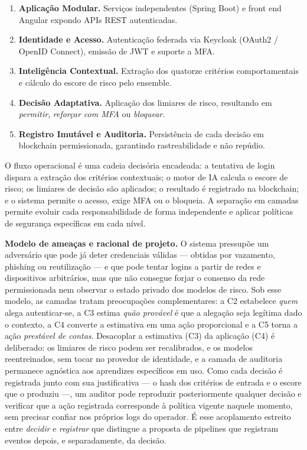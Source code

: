 \documentclass[conference]{IEEEtran}
\begin{document}
\begin{enumerate}
  \item \textbf{Aplicação Modular.} Serviços independentes (Spring Boot)
        e front end Angular expondo APIs REST autenticadas.
  \item \textbf{Identidade e Acesso.} Autenticação federada via Keycloak
        (OAuth2 / OpenID Connect), emissão de JWT e suporte a MFA.
  \item \textbf{Inteligência Contextual.} Extração dos quatorze critérios
        comportamentais e cálculo do escore de risco pelo ensemble.
  \item \textbf{Decisão Adaptativa.} Aplicação dos limiares de risco,
        resultando em \emph{permitir}, \emph{reforçar com MFA} ou
        \emph{bloquear}.
  \item \textbf{Registro Imutável e Auditoria.} Persistência de cada
        decisão em blockchain permissionada, garantindo rastreabilidade
        e não repúdio.
\end{enumerate}

O fluxo operacional é uma cadeia decisória encadeada: a tentativa de
login dispara a extração dos critérios contextuais; o motor de IA calcula
o escore de risco; os limiares de decisão são aplicados; o resultado é
registrado na blockchain; e o sistema permite o acesso, exige MFA ou o
bloqueia. A separação em camadas permite evoluir cada responsabilidade de
forma independente e aplicar políticas de segurança específicas em cada
nível.

\textbf{Modelo de ameaças e racional de projeto.} O sistema pressupõe um
adversário que pode já deter credenciais válidas --- obtidas por
vazamento, phishing ou reutilização --- e que pode tentar logins a partir
de redes e dispositivos arbitrários, mas que não consegue forjar o
consenso da rede permissionada nem observar o estado privado dos modelos
de risco. Sob esse modelo, as camadas tratam preocupações complementares:
a C2 estabelece \emph{quem} alega autenticar-se, a C3 estima \emph{quão
provável} é que a alegação seja legítima dado o contexto, a C4 converte a
estimativa em uma ação proporcional e a C5 torna a ação
\emph{prestável de contas}. Desacoplar a estimativa (C3) da aplicação
(C4) é deliberado: os limiares de risco podem ser recalibrados, e os
modelos reentreinados, sem tocar no provedor de identidade, e a camada de
auditoria permanece agnóstica aos aprendizes específicos em uso. Como
cada decisão é registrada junto com sua justificativa --- o hash dos
critérios de entrada e o escore que o produziu ---, um auditor pode
reproduzir posteriormente qualquer decisão e verificar que a ação
registrada corresponde à política vigente naquele momento, sem precisar
confiar nos próprios logs do operador. É esse acoplamento estreito entre
\emph{decidir} e \emph{registrar} que distingue a proposta de pipelines
que registram eventos depois, e separadamente, da decisão.
\end{document}
